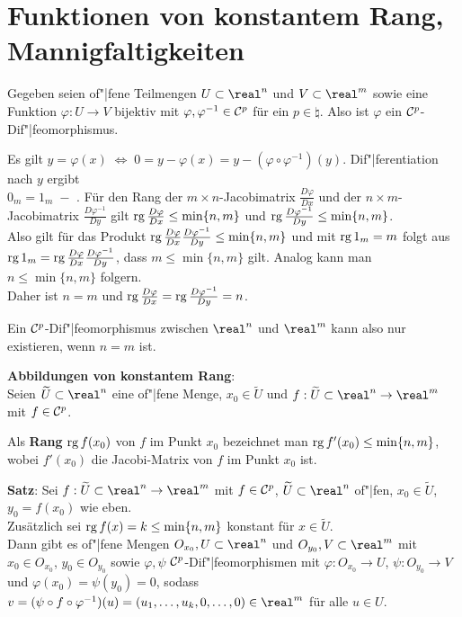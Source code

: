 \section{%
    Funktionen von konstantem Rang, Mannigfaltigkeiten%
}

Gegeben seien of"|fene Teilmengen $U \subset \real^n$ und $V \subset \real^m$
sowie eine Funktion $\varphi: U \rightarrow V$ bijektiv mit
$\varphi, \varphi^{-1} \in \mathcal{C}^p$ für ein $p \in \natural$.
Also ist $\varphi$ ein $\mathcal{C}^p$-Dif"|feomorphismus.

Es gilt $y = \varphi(x) \;\Leftrightarrow\; 0 = y - \varphi(x)
= y - (\varphi \circ \varphi^{-1})(y)$.
Dif"|ferentiation nach $y$ ergibt \\
$0_m = 1_m \;-$ .
Für den Rang der $m \times n$-Jacobimatrix $\frac{D \varphi}{Dx}$ und
der $n \times m$-Jacobimatrix $\frac{D \varphi^{-1}}{Dy}$ gilt
$\operatorname{rg} \frac{D \varphi}{Dx} \le \min\{n, m\}$ und
$\operatorname{rg} \frac{D \varphi^{-1}}{Dy} \le \min\{n, m\}$. \\
Also gilt für das Produkt
$\operatorname{rg} \frac{D \varphi}{Dx} \frac{D \varphi^{-1}}{Dy} \le \min\{n, m\}$
und mit $\operatorname{rg} 1_m = m$ folgt aus \\
$\operatorname{rg} 1_m = \operatorname{rg} \frac{D \varphi}{Dx} \frac{D \varphi^{-1}}{Dy}$, dass
$m \le \min\{n, m\}$ gilt.
Analog kann man $n \le \min\{n, m\}$ folgern. \\
Daher ist $n = m$ und
$\operatorname{rg} \frac{D \varphi}{Dx} = \operatorname{rg} \frac{D \varphi^{-1}}{Dy} = n$.

Ein $\mathcal{C}^p$-Dif"|feomorphismus zwischen $\real^n$ und $\real^m$ kann also
nur existieren, wenn $n = m$ ist.

\linie

\textbf{Abbildungen von konstantem Rang}: \\
Seien $\widetilde{U} \subset \real^n$ eine of"|fene Menge,
$x_0 \in \widetilde{U}$ und
$f: \widetilde{U} \subset \real^n \rightarrow \real^m$ mit $f \in \mathcal{C}^p$.

Als \textbf{Rang} $\operatorname{rg} f(x_0)$ von $f$ im Punkt $x_0$ bezeichnet man
$\operatorname{rg} f'(x_0) \le \min\{n, m\}$, wobei $f'(x_0)$ die Jacobi-Matrix von $f$
im Punkt $x_0$ ist.

\textbf{Satz}:
Sei $f: \widetilde{U} \subset \real^n \rightarrow \real^m$ mit
$f \in \mathcal{C}^p$, $\widetilde{U} \subset \real^n$ of"|fen,
$x_0 \in \widetilde{U}$, $y_0 = f(x_0)$ wie eben. \\
Zusätzlich sei $\operatorname{rg} f(x) = k \le \min\{n, m\}$ konstant für
$x \in \widetilde{U}$. \\
Dann gibt es of"|fene Mengen $O_{x_0}, U \subset \real^n$ und
$O_{y_0}, V \subset \real^m$ mit $x_0 \in O_{x_0}$, $y_0 \in O_{y_0}$ sowie
$\varphi, \psi$ $\mathcal{C}^p$-Dif"|feomorphismen mit
$\varphi: O_{x_0} \rightarrow U$,
$\psi: O_{y_0} \rightarrow V$ und
$\varphi(x_0) = \psi(y_0) = 0$, sodass
$v = (\psi \circ f \circ \varphi^{-1})(u) =
(u_1, \dotsc, u_k, 0, \dotsc, 0) \in \real^m$
für alle $u \in U$.

